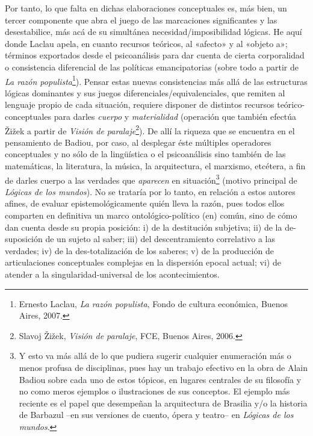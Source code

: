 Por tanto, lo que falta en dichas elaboraciones conceptuales es, más bien, un tercer componente que abra el juego de las marcaciones significantes y las desestabilice, más acá de su simultánea necesidad/imposibilidad lógicas. He aquí donde Laclau apela, en cuanto recursos teóricos, al «afecto» y al «objeto a»; términos exportados desde el psicoanálisis para dar cuenta de cierta corporalidad o consistencia diferencial de las políticas emancipatorias (sobre todo a partir de \emph{La razón populista}\footnote{Ernesto Laclau, \emph{La razón populista}, Fondo de cultura económica, Buenos Aires, 2007.}). Pensar estas nuevas consistencias más allá de las estructuras lógicas dominantes y sus juegos diferenciales/equivalenciales, que remiten al lenguaje propio de cada situación, requiere disponer de distintos recursos teórico-conceptuales para darles \emph{cuerpo} y \emph{materialidad} (operación que también efectúa Žižek a partir de \emph{Visión de paralaje}\footnote{Slavoj Žižek, \emph{Visión de paralaje}, FCE, Buenos Aires, 2006.}). De allí la riqueza que se encuentra en el pensamiento de Badiou, por caso, al desplegar éste múltiples operadores conceptuales y no sólo de la lingüística o el psicoanálisis sino también de las matemáticas, la literatura, la música, la arquitectura, el marxismo, etcétera, a fin de darles cuerpo a las verdades que \emph{aparecen} en situación\footnote{Y esto va más allá de lo que pudiera sugerir cualquier enumeración más o menos profusa de disciplinas, pues hay un trabajo efectivo en la obra de Alain Badiou sobre cada uno de estos tópicos, en lugares centrales de su filosofía y no como meros ejemplos o ilustraciones de sus conceptos. El ejemplo más reciente es el papel que desempeñan la arquitectura de Brasilia y/o la historia de Barbazul --en sus versiones de cuento, ópera y teatro-- en \emph{Lógicas de los mundos}.} (motivo principal de \emph{Lógicas de los mundos}). No se trataría por lo tanto, en relación a estos autores afines, de evaluar epistemológicamente quién lleva la razón, pues todos ellos comparten en definitiva un marco ontológico-político (en) común, sino de cómo dan cuenta desde su propia posición: i) de la destitución subjetiva; ii) de la de-suposición de un sujeto al saber; iii) del descentramiento correlativo a las verdades; iv) de la des-totalización de los saberes; v) de la producción de articulaciones conceptuales complejas en la dispersión epocal actual; vi) de atender a la singularidad-universal de los acontecimientos.

